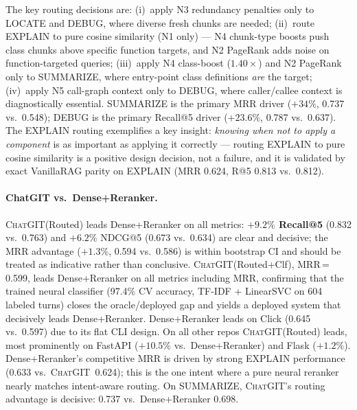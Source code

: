 \documentclass[runningheads]{llncs}
\newcommand{\chatgit}{\textsc{ChatGIT}\xspace}
\begin{document}
The key routing decisions are:
(i)~apply N3 redundancy penalties only to LOCATE and DEBUG, where
diverse fresh chunks are needed; (ii)~route EXPLAIN to pure cosine
similarity (N1 only) --- N4 chunk-type boosts push class chunks
above specific function targets, and N2 PageRank adds noise on
function-targeted queries; (iii)~apply N4 class-boost
($1.40\times$) and N2 PageRank only to SUMMARIZE, where
entry-point class definitions \emph{are} the target; (iv)~apply
N5 call-graph context only to DEBUG, where caller/callee context
is diagnostically essential.
SUMMARIZE is the primary MRR driver ($+34\%$, 0.737 vs.\ 0.548);
DEBUG is the primary Recall@5 driver ($+23.6\%$, 0.787 vs.\ 0.637).
The EXPLAIN routing exemplifies a key insight: \emph{knowing when
not to apply a component} is as important as applying it correctly ---
routing EXPLAIN to pure cosine similarity is a positive design
decision, not a failure, and it is validated by exact VanillaRAG
parity on EXPLAIN (MRR 0.624, R@5 0.813 vs.\ 0.812).

\paragraph{ChatGIT vs.\ Dense+Reranker.}
\chatgit (Routed) leads Dense+Reranker on all metrics:
\textbf{$+9.2\%$ Recall@5} (0.832 vs.\ 0.763) and $+6.2\%$
NDCG@5 (0.673 vs.\ 0.634) are clear and decisive; the MRR
advantage ($+1.3\%$, 0.594 vs.\ 0.586) is within bootstrap CI
and should be treated as indicative rather than conclusive.
\chatgit (Routed+Clf), MRR\,=\,0.599, leads Dense+Reranker on
all metrics including MRR, confirming that the trained neural
classifier (97.4\% CV accuracy, TF-IDF + LinearSVC on 604 labeled
turns) closes the oracle/deployed gap and yields a deployed system
that decisively leads Dense+Reranker.
Dense+Reranker leads on Click (0.645 vs.\ 0.597) due to its
flat CLI design. On all other repos \chatgit (Routed) leads,
most prominently on FastAPI ($+10.5\%$ vs.\ Dense+Reranker)
and Flask ($+1.2\%$). Dense+Reranker's competitive MRR is
driven by strong EXPLAIN performance (0.633 vs.\ \chatgit\
0.624); this is the one intent where a pure neural reranker
nearly matches intent-aware routing. On SUMMARIZE, \chatgit's
routing advantage is decisive: 0.737 vs.\ Dense+Reranker 0.698.
\end{document}
